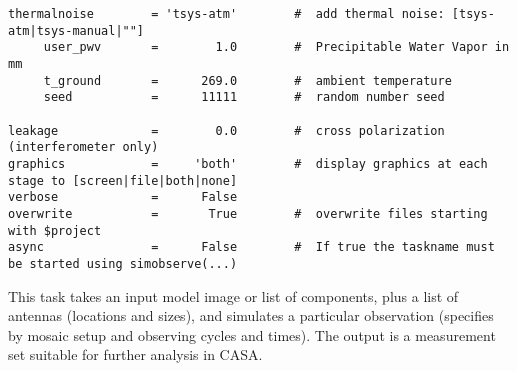 \begin{verbatim}
thermalnoise        = 'tsys-atm'        #  add thermal noise: [tsys-atm|tsys-manual|""]
     user_pwv       =        1.0        #  Precipitable Water Vapor in mm
     t_ground       =      269.0        #  ambient temperature
     seed           =      11111        #  random number seed

leakage             =        0.0        #  cross polarization (interferometer only)
graphics            =     'both'        #  display graphics at each stage to [screen|file|both|none]
verbose             =      False        
overwrite           =       True        #  overwrite files starting with $project
async               =      False        #  If true the taskname must be started using simobserve(...)
\end{verbatim}
\normalsize

This task takes an input model image or list of components, plus a
list of antennas (locations and sizes), and simulates a particular
observation (specifies by mosaic setup and observing cycles and
times).  The output is a measurement set suitable for further analysis in CASA.

